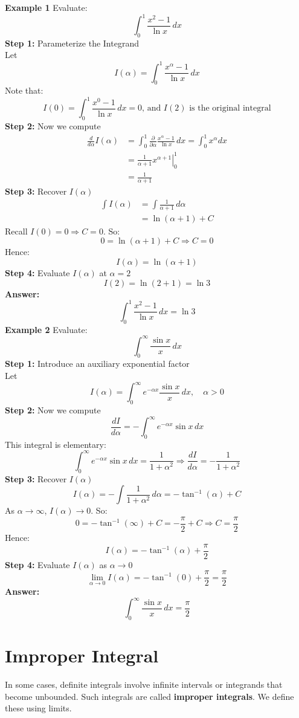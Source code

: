 \documentclass[11pt]{article}
\begin{document}
\textbf{Example 1}
Evaluate:
\[
    \int_0^1 \frac{x^2-1}{\ln x}\,dx
\]
\textbf{Step 1: }Parameterize the Integrand\\
Let
\[
    I(\alpha)=\int_0^1 \frac{x^\alpha-1}{\ln x}\,dx
\]Note that:
\[
    I(0)=\int_0^1 \frac{x^0-1}{\ln x}\,dx=0\text{, and }I(2)\text{ is the original integral}
\]
\textbf{Step 2: }Now we compute
\[
    \begin{split}
        \frac{d}{d\alpha}I(\alpha)&=\int_0^1 \frac{\partial}{\partial\alpha}\frac{x^\alpha-1}{\ln x}\,dx=\int_0^1 x^\alpha dx\\
        &=\left.\frac{1}{\alpha +1}x^{\alpha +1}\right|_0^1\\
        &=\frac{1}{\alpha + 1} 
    \end{split}
\]
\textbf{Step 3: }Recover $I(\alpha)$
\[
    \begin{split}
        \int I(\alpha)&=\int \frac{1}{\alpha + 1}\,d\alpha\\
        &=\ln(\alpha + 1)+C
    \end{split}
\]Recall $I(0)=0 \Rightarrow C=0$. So:
\[
    0=\ln(\alpha + 1)+C\Rightarrow C=0
\]
Hence:
\[
    I(\alpha)=\ln(\alpha + 1)
\]
\textbf{Step 4: }Evaluate $I(\alpha)$ at $\alpha = 2$
\[
    I(2)=\ln(2 + 1)=\ln3
\]
\textbf{Answer: }
\[
    \int_0^1 \frac{x^2-1}{\ln x}\,dx=\ln3
\]
\newline
\textbf{Example 2}
Evaluate:
\[
    \int_0^{\infty} \frac{\sin x}{x}\,dx
\]
\textbf{Step 1: }Introduce an auxiliary exponential factor\\
Let
\[
    I(\alpha) = \int_0^{\infty} e^{-\alpha x} \frac{\sin x}{x} \, dx, \quad \alpha > 0
\]
\textbf{Step 2: }Now we compute
\[
    \frac{dI}{d\alpha} = -\int_0^{\infty} e^{-\alpha x} \sin x \, dx
\]
This integral is elementary:
\[
    \int_0^{\infty} e^{-\alpha x} \sin x \, dx = \frac{1}{1 + \alpha^2}
    \Rightarrow \frac{dI}{d\alpha} = -\frac{1}{1 + \alpha^2}
\]
\textbf{Step 3: }Recover $I(\alpha)$
\[
    I(\alpha) = -\int \frac{1}{1 + \alpha^2} \, d\alpha = -\tan^{-1}(\alpha) + C
\]
As $\alpha \to \infty$, $I(\alpha) \to 0$. So:
\[
    0 = -\tan^{-1}(\infty) + C = -\frac{\pi}{2} + C \Rightarrow C = \frac{\pi}{2}
\]
Hence:
\[
    I(\alpha) = - \tan^{-1}(\alpha)+\frac{\pi}{2}
\]
\textbf{Step 4: }Evaluate $I(\alpha)$ as $\alpha \to 0$
\[
    \lim_{\alpha \to 0} I(\alpha) = -\tan^{-1}(0)+\frac{\pi}{2} = \frac{\pi}{2}
\]
\textbf{Answer: }
\[
    \int_0^{\infty} \frac{\sin x}{x}\,dx=\frac{\pi}{2}
\]


\newpage
\section{Improper Integral}
In some cases, definite integrals involve infinite intervals or integrands that become unbounded. Such integrals are called \textbf{improper integrals}. We define these using limits.
\end{document}
